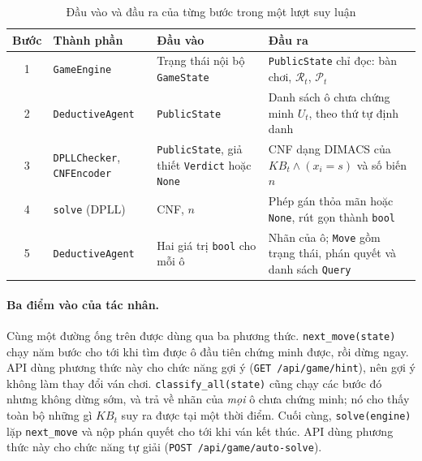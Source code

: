 \begin{sloppypar}
\begin{table}[htbp]
  \centering\small
  \caption{Đầu vào và đầu ra của từng bước trong một lượt suy luận}
  \label{tab:agent_pipeline}
  \begin{tabularx}{\textwidth}{c>{\raggedright\arraybackslash}p{3.5cm}%
      >{\raggedright\arraybackslash}X>{\raggedright\arraybackslash}X}
    \toprule
    \textbf{Bước} & \textbf{Thành phần} & \textbf{Đầu vào} & \textbf{Đầu ra} \\
    \midrule
    1 & \texttt{GameEngine} & Trạng thái nội bộ \texttt{GameState}
      & \texttt{PublicState} chỉ đọc: bàn chơi, $\mathcal{R}_t$, $\mathcal{P}_t$ \\
    2 & \texttt{DeductiveAgent} & \texttt{PublicState}
      & Danh sách ô chưa chứng minh $U_t$, theo thứ tự định danh \\
    3 & \texttt{DPLLChecker}, \texttt{CNFEncoder}
      & \texttt{PublicState}, giả thiết \texttt{Verdict} hoặc \texttt{None}
      & CNF dạng DIMACS của $\mathit{KB}_t \land (x_i = s)$ và số biến $n$ \\
    4 & \texttt{solve} (DPLL) & CNF, $n$
      & Phép gán thỏa mãn hoặc \texttt{None}, rút gọn thành \texttt{bool} \\
    5 & \texttt{DeductiveAgent} & Hai giá trị \texttt{bool} cho mỗi ô
      & Nhãn của ô; \texttt{Move} gồm trạng thái, phán quyết và danh sách
        \texttt{Query} \\
    \bottomrule
  \end{tabularx}
\end{table}

\paragraph{Ba điểm vào của tác nhân.}
Cùng một đường ống trên được dùng qua ba phương thức.
\texttt{next\_move(state)} chạy năm bước cho tới khi tìm được ô đầu tiên chứng
minh được, rồi dừng ngay. API dùng phương thức này cho chức năng gợi ý
(\texttt{GET /api/game/hint}), nên gợi ý không làm thay đổi ván chơi.
\texttt{classify\_all(state)} cũng chạy các bước đó nhưng không dừng sớm, và
trả về nhãn của \emph{mọi} ô chưa chứng minh; nó cho thấy toàn bộ những gì
$\mathit{KB}_t$ suy ra được tại một thời điểm. Cuối cùng,
\texttt{solve(engine)} lặp \texttt{next\_move} và nộp phán quyết cho tới khi
ván kết thúc. API dùng phương thức này cho chức năng tự giải
(\texttt{POST /api/game/auto-solve}).


\end{sloppypar}
